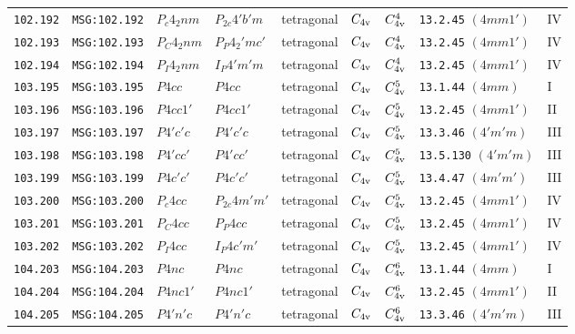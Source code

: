 \documentclass[fleqn,10pt]{jsarticle}
\begin{document}
\begin{center}
\begin{longtable}{lllllllll}
\texttt{102.192} & \texttt{MSG:102.192} & $P_{c}4_{2}nm$ & $P_{2c}4'b'm$ & tetragonal & $C_{\rm 4v}$ & $C_{\rm 4v}^{4}$ & \texttt{13.2.45} $(4mm1')$ & IV \\
\texttt{102.193} & \texttt{MSG:102.193} & $P_{C}4_{2}nm$ & $P_{P}4_{2}'mc'$ & tetragonal & $C_{\rm 4v}$ & $C_{\rm 4v}^{4}$ & \texttt{13.2.45} $(4mm1')$ & IV \\
\texttt{102.194} & \texttt{MSG:102.194} & $P_{I}4_{2}nm$ & $I_{P}4'm'm$ & tetragonal & $C_{\rm 4v}$ & $C_{\rm 4v}^{4}$ & \texttt{13.2.45} $(4mm1')$ & IV \\ \hline
\texttt{103.195} & \texttt{MSG:103.195} & $P4cc$ & $P4cc$ & tetragonal & $C_{\rm 4v}$ & $C_{\rm 4v}^{5}$ & \texttt{13.1.44} $(4mm)$ & I \\
\texttt{103.196} & \texttt{MSG:103.196} & $P4cc1'$ & $P4cc1'$ & tetragonal & $C_{\rm 4v}$ & $C_{\rm 4v}^{5}$ & \texttt{13.2.45} $(4mm1')$ & II \\
\texttt{103.197} & \texttt{MSG:103.197} & $P4'c'c$ & $P4'c'c$ & tetragonal & $C_{\rm 4v}$ & $C_{\rm 4v}^{5}$ & \texttt{13.3.46} $(4'm'm)$ & III \\
\texttt{103.198} & \texttt{MSG:103.198} & $P4'cc'$ & $P4'cc'$ & tetragonal & $C_{\rm 4v}$ & $C_{\rm 4v}^{5}$ & \texttt{13.5.130} $(4'm'm)$ & III \\
\texttt{103.199} & \texttt{MSG:103.199} & $P4c'c'$ & $P4c'c'$ & tetragonal & $C_{\rm 4v}$ & $C_{\rm 4v}^{5}$ & \texttt{13.4.47} $(4m'm')$ & III \\
\texttt{103.200} & \texttt{MSG:103.200} & $P_{c}4cc$ & $P_{2c}4m'm'$ & tetragonal & $C_{\rm 4v}$ & $C_{\rm 4v}^{5}$ & \texttt{13.2.45} $(4mm1')$ & IV \\
\texttt{103.201} & \texttt{MSG:103.201} & $P_{C}4cc$ & $P_{P}4cc$ & tetragonal & $C_{\rm 4v}$ & $C_{\rm 4v}^{5}$ & \texttt{13.2.45} $(4mm1')$ & IV \\
\texttt{103.202} & \texttt{MSG:103.202} & $P_{I}4cc$ & $I_{P}4c'm'$ & tetragonal & $C_{\rm 4v}$ & $C_{\rm 4v}^{5}$ & \texttt{13.2.45} $(4mm1')$ & IV \\ \hline
\texttt{104.203} & \texttt{MSG:104.203} & $P4nc$ & $P4nc$ & tetragonal & $C_{\rm 4v}$ & $C_{\rm 4v}^{6}$ & \texttt{13.1.44} $(4mm)$ & I \\
\texttt{104.204} & \texttt{MSG:104.204} & $P4nc1'$ & $P4nc1'$ & tetragonal & $C_{\rm 4v}$ & $C_{\rm 4v}^{6}$ & \texttt{13.2.45} $(4mm1')$ & II \\
\texttt{104.205} & \texttt{MSG:104.205} & $P4'n'c$ & $P4'n'c$ & tetragonal & $C_{\rm 4v}$ & $C_{\rm 4v}^{6}$ & \texttt{13.3.46} $(4'm'm)$ & III \\

\end{longtable}
\end{center}
\end{document}
